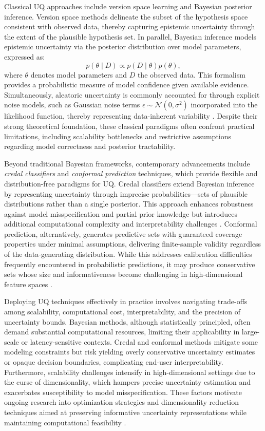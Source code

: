 \documentclass[sigconf]{acmart}
\begin{document}
Classical UQ approaches include version space learning and Bayesian posterior inference. Version space methods delineate the subset of the hypothesis space consistent with observed data, thereby capturing epistemic uncertainty through the extent of the plausible hypothesis set. In parallel, Bayesian inference models epistemic uncertainty via the posterior distribution over model parameters, expressed as:
\[
p(\theta \mid D) \propto p(D \mid \theta) p(\theta),
\]
where \( \theta \) denotes model parameters and \( D \) the observed data. This formalism provides a probabilistic measure of model confidence given available evidence. Simultaneously, aleatoric uncertainty is commonly accounted for through explicit noise models, such as Gaussian noise terms \(\epsilon \sim \mathcal{N}(0, \sigma^2)\) incorporated into the likelihood function, thereby representing data-inherent variability \cite{ref28}. Despite their strong theoretical foundation, these classical paradigms often confront practical limitations, including scalability bottlenecks and restrictive assumptions regarding model correctness and posterior tractability.

Beyond traditional Bayesian frameworks, contemporary advancements include \emph{credal classifiers} and \emph{conformal prediction} techniques, which provide flexible and distribution-free paradigms for UQ. Credal classifiers extend Bayesian inference by representing uncertainty through imprecise probabilities—sets of plausible distributions rather than a single posterior. This approach enhances robustness against model misspecification and partial prior knowledge but introduces additional computational complexity and interpretability challenges \cite{ref28}. Conformal prediction, alternatively, generates predictive sets with guaranteed coverage properties under minimal assumptions, delivering finite-sample validity regardless of the data-generating distribution. While this addresses calibration difficulties frequently encountered in probabilistic predictions, it may produce conservative sets whose size and informativeness become challenging in high-dimensional feature spaces .

Deploying UQ techniques effectively in practice involves navigating trade-offs among scalability, computational cost, interpretability, and the precision of uncertainty bounds. Bayesian methods, although statistically principled, often demand substantial computational resources, limiting their applicability in large-scale or latency-sensitive contexts. Credal and conformal methods mitigate some modeling constraints but risk yielding overly conservative uncertainty estimates or opaque decision boundaries, complicating end-user interpretability. Furthermore, scalability challenges intensify in high-dimensional settings due to the curse of dimensionality, which hampers precise uncertainty estimation and exacerbates susceptibility to model misspecification. These factors motivate ongoing research into optimization strategies and dimensionality reduction techniques aimed at preserving informative uncertainty representations while maintaining computational feasibility \cite{ref28}.
\end{document}
